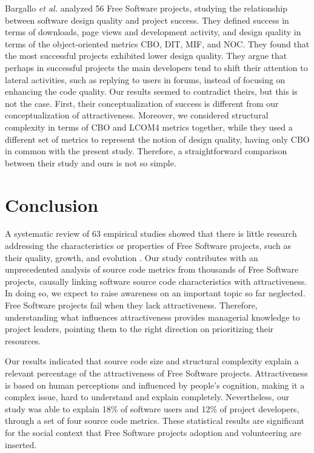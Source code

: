 \documentclass[conference]{IEEEtran}
\begin{document}
Bargallo \emph{et al.} \cite{bargallo2008} analyzed 56 Free Software projects,
studying the relationship between software design quality and project success.
%
They defined success in terms of downloads, page views and development activity,
and design quality in terms of the object-oriented metrics CBO, DIT, MIF, and NOC.
%
They found that the most successful projects exhibited lower design
quality. They argue that perhaps in successful projects the main
developers tend to shift their attention to lateral activities, such as
replying to users in forums, instead of focusing on enhancing the code quality.
%
Our results seemed to contradict theirs, but this is not the case. First, their
conceptualization of success is different from our conceptualization of
attractiveness.
%
Moreover, we considered structural complexity in terms of CBO
and LCOM4 metrics together, while they used a different set of metrics to
represent the notion of design quality, having only CBO in common with
the present study. Therefore, a straightforward comparison between their study and ours is not so simple.

\section{Conclusion}
\label{conclusion}

A systematic review of 63 empirical studies showed that there is little research
addressing the characteristics or properties of Free Software projects,
such as their quality, growth, and evolution \cite{Stol2009}.
%
Our study contributes with an unprecedented analysis of
source code metrics from thousands of Free Software projects,
causally linking software source code characteristics with attractiveness.
%
In doing so, we expect to raise awareness on an important topic so far
neglected. Free Software projects fail when they lack attractiveness.
Therefore, understanding what influences attractiveness provides
managerial knowledge to project leaders, pointing them to the right
direction on prioritizing their resources.

Our results indicated that source code size and structural complexity
explain a relevant percentage of the attractiveness of Free Software projects.
%
Attractiveness is based on human perceptions and influenced by people's
cognition, making it a complex issue, hard to understand and explain
completely.
%
Nevertheless, our study was able to explain 18\% of software
users and 12\% of project developers, through a set of four source code metrics.
%
These statistical results are significant for the social context that
Free Software projects adoption and volunteering are inserted.
\end{document}
